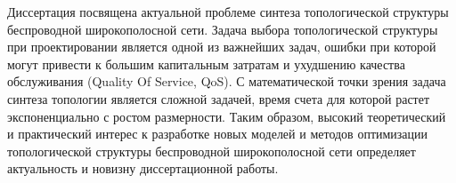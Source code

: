 

Диссертация посвящена актуальной проблеме синтеза топологической структуры беспроводной широкополосной сети. Задача выбора топологической структуры при проектировании является одной из важнейших задач, ошибки при которой могут привести к большим капитальным затратам и ухудшению качества обслуживания (Quality Of Service, QoS). С математической точки зрения задача синтеза топологии является сложной задачей, время счета для которой растет экспоненциально с ростом размерности. Таким образом, высокий теоретический и практический интерес к разработке новых моделей и методов оптимизации топологической структуры беспроводной широкополосной сети определяет актуальность и новизну диссертационной работы.






